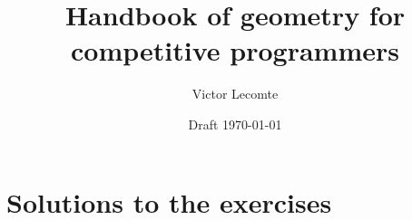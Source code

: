 \documentclass[a4paper,11pt]{report}
\title{Handbook of geometry for competitive programmers}
\author{Victor Lecomte}
\date{Draft \today}
\begin{document}
\maketitle
\tableofcontents




\appendix
\chapter{Solutions to the exercises}




\printbibliography
\end{document}
